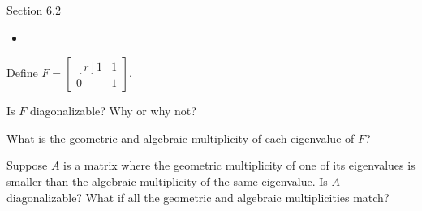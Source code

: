 \documentclass{problemset}
\newcommand{\mat}[1]{\begin{bmatrix*}[r]#1\end{bmatrix*}}
\begin{document}
\begin{lesson}
	\newpage

	Section 6.2

	\begin{itemize}
		\item 
	\end{itemize}


	\newpage
\end{lesson}
	\question
	Define $F=\mat{1&1\\0&1}$.
	\begin{parts}
		\item Is $F$ diagonalizable?  Why or why not?
		\item What is the geometric and algebraic multiplicity of each eigenvalue
			of $F$?
		\item Suppose $A$ is a matrix where the geometric multiplicity of one of its eigenvalues
			is smaller than the algebraic multiplicity of the same eigenvalue.  Is
			$A$ diagonalizable?  What if all the geometric and algebraic multiplicities
			match?
	\end{parts}
\end{document}
